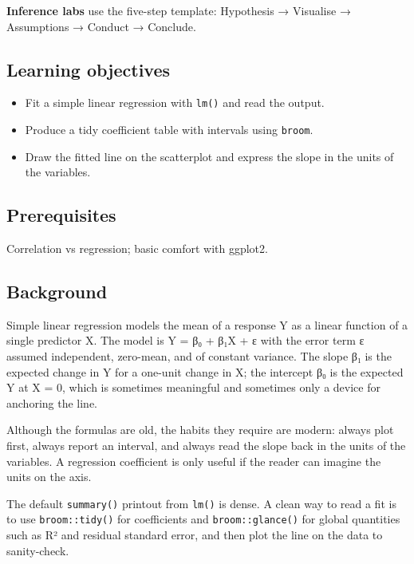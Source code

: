 \documentclass[
]{article}
\author{}
\date{\vspace{-2.5em}}
\providecommand{\tightlist}{%
  \setlength{\itemsep}{0pt}\setlength{\parskip}{0pt}}
\begin{document}
\textbf{Inference labs} use the five-step template: Hypothesis →
Visualise → Assumptions → Conduct → Conclude.

\subsection{Learning objectives}\label{learning-objectives}

\begin{itemize}
\tightlist
\item
  Fit a simple linear regression with \texttt{lm()} and read the output.
\item
  Produce a tidy coefficient table with intervals using \texttt{broom}.
\item
  Draw the fitted line on the scatterplot and express the slope in the
  units of the variables.
\end{itemize}

\subsection{Prerequisites}\label{prerequisites}

Correlation vs regression; basic comfort with ggplot2.

\subsection{Background}\label{background}

Simple linear regression models the mean of a response Y as a linear
function of a single predictor X. The model is Y = β₀ + β₁X + ε with the
error term ε assumed independent, zero-mean, and of constant variance.
The slope β₁ is the expected change in Y for a one-unit change in X; the
intercept β₀ is the expected Y at X = 0, which is sometimes meaningful
and sometimes only a device for anchoring the line.

Although the formulas are old, the habits they require are modern:
always plot first, always report an interval, and always read the slope
back in the units of the variables. A regression coefficient is only
useful if the reader can imagine the units on the axis.

The default \texttt{summary()} printout from \texttt{lm()} is dense. A
clean way to read a fit is to use \texttt{broom::tidy()} for
coefficients and \texttt{broom::glance()} for global quantities such as
R² and residual standard error, and then plot the line on the data to
sanity-check.
\end{document}
